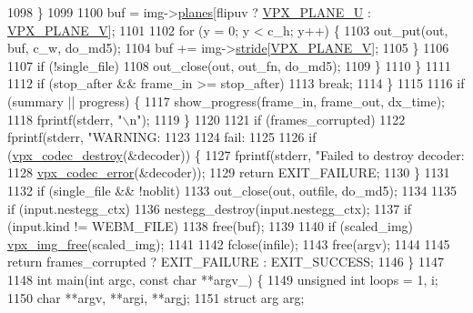 \begin{DoxyCodeInclude}
{{{{{{{{{{{{{{{{{{{{{{{{{{{{{{{{{{{{{{{{1098         \}
1099 
1100         buf = img->\hyperlink{structvpx__image_ab6258308ba7a5f4a113348120e20e2ce}{planes}[flipuv ? \hyperlink{vpx__image_8h_a4770fc8fa60021a2229f25553152cf81}{VPX\_PLANE\_U} : \hyperlink{vpx__image_8h_aca9436ec761457cc6d2e356e0ac2fd23}{VPX\_PLANE\_V}];
1101 
1102         \textcolor{keywordflow}{for} (y = 0; y < c\_h; y++) \{
1103           out\_put(out, buf, c\_w, do\_md5);
1104           buf += img->\hyperlink{structvpx__image_ac9c7b83e3eea44cb680956f90dc789cf}{stride}[\hyperlink{vpx__image_8h_aca9436ec761457cc6d2e356e0ac2fd23}{VPX\_PLANE\_V}];
1105         \}
1106 
1107         \textcolor{keywordflow}{if} (!single\_file)
1108           out\_close(out, out\_fn, do\_md5);
1109       \}
1110     \}
1111 
1112     \textcolor{keywordflow}{if} (stop\_after && frame\_in >= stop\_after)
1113       \textcolor{keywordflow}{break};
1114   \}
1115 
1116   \textcolor{keywordflow}{if} (summary || progress) \{
1117     show\_progress(frame\_in, frame\_out, dx\_time);
1118     fprintf(stderr, \textcolor{stringliteral}{"\(\backslash\)n"});
1119   \}
1120 
1121   \textcolor{keywordflow}{if} (frames\_corrupted)
1122     fprintf(stderr, \textcolor{stringliteral}{"WARNING: %
1123 
1124 fail:
1125 
1126   \textcolor{keywordflow}{if} (\hyperlink{group__codec_ga6ae21d96909660d0ac978b59a863f53b}{vpx\_codec\_destroy}(&decoder)) \{
1127     fprintf(stderr, \textcolor{stringliteral}{"Failed to destroy decoder: %
1128             \hyperlink{group__codec_ga4d265df00d42b36a4f0e3eb83fc22c5e}{vpx\_codec\_error}(&decoder));
1129     \textcolor{keywordflow}{return} EXIT\_FAILURE;
1130   \}
1131 
1132   \textcolor{keywordflow}{if} (single\_file && !noblit)
1133     out\_close(out, outfile, do\_md5);
1134 
1135   \textcolor{keywordflow}{if} (input.nestegg\_ctx)
1136     nestegg\_destroy(input.nestegg\_ctx);
1137   \textcolor{keywordflow}{if} (input.kind != WEBM\_FILE)
1138     free(buf);
1139 
1140   \textcolor{keywordflow}{if} (scaled\_img) \hyperlink{vpx__image_8h_af47ebaf286812d037425d41990d48a17}{vpx\_img\_free}(scaled\_img);
1141 
1142   fclose(infile);
1143   free(argv);
1144 
1145   \textcolor{keywordflow}{return} frames\_corrupted ? EXIT\_FAILURE : EXIT\_SUCCESS;
1146 \}
1147 
1148 \textcolor{keywordtype}{int} main(\textcolor{keywordtype}{int} argc, \textcolor{keyword}{const} \textcolor{keywordtype}{char} **argv\_) \{
1149   \textcolor{keywordtype}{unsigned} \textcolor{keywordtype}{int} loops = 1, i;
1150   \textcolor{keywordtype}{char} **argv, **argi, **argj;
1151   \textcolor{keyword}{struct }arg arg;
}}}}}}}}}}}}}}}}}}}}}}}}}}}}}}}}}}}}}}}}}}
\end{DoxyCodeInclude}
